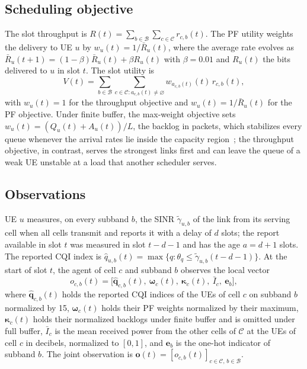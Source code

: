 \documentclass{ieeeaccess}
\begin{document}
\subsection{Scheduling objective}
The slot throughput is $R(t) = \sum_{b \in \mathcal{B}} \sum_{c \in \mathcal{C}} r_{c,b}(t)$. The PF utility weights the delivery to UE $u$ by $w_u(t) = 1/\bar{R}_u(t)$, where the average rate evolves as $\bar{R}_u(t+1) = (1 - \beta)\bar{R}_u(t) + \beta R_u(t)$ with $\beta = 0.01$ and $R_u(t)$ the bits delivered to $u$ in slot $t$. The slot utility is
\begin{equation}
V(t) = \sum_{b \in \mathcal{B}} \sum_{c \in \mathcal{C} : a_{c,b}(t) \ne \varnothing} w_{a_{c,b}(t)}(t)\, r_{c,b}(t),
\label{eq:utility}
\end{equation}
with $w_u(t) = 1$ for the throughput objective and $w_u(t) = 1/\bar{R}_u(t)$ for the PF objective. Under finite buffer, the max-weight objective sets $w_u(t) = (Q_u(t) + A_u(t))/L$, the backlog in packets, which stabilizes every queue whenever the arrival rates lie inside the capacity region~\cite{tassiulas1992stability}; the throughput objective, in contrast, serves the strongest links first and can leave the queue of a weak UE unstable at a load that another scheduler serves.

\subsection{Observations}
UE $u$ measures, on every subband $b$, the SINR $\tilde{\gamma}_{u,b}$ of the link from its serving cell when all cells transmit and reports it with a delay of $d$ slots; the report available in slot $t$ was measured in slot $t - d - 1$ and has the age $a = d + 1$ slots. The reported CQI index is $\hat{q}_{u,b}(t) = \max\{ q : \theta_q \le \tilde{\gamma}_{u,b}(t - d - 1) \}$. At the start of slot $t$, the agent of cell $c$ and subband $b$ observes the local vector
\begin{equation}
o_{c,b}(t) = \bigl[\hat{\mathbf{q}}_{c,b}(t),\ \boldsymbol{\omega}_{c}(t),\ \boldsymbol{\kappa}_{c}(t),\ \bar{I}_{c},\ \mathbf{e}_b\bigr],
\label{eq:obs}
\end{equation}
where $\hat{\mathbf{q}}_{c,b}(t)$ holds the reported CQI indices of the UEs of cell $c$ on subband $b$ normalized by 15, $\boldsymbol{\omega}_{c}(t)$ holds their PF weights normalized by their maximum, $\boldsymbol{\kappa}_{c}(t)$ holds their normalized backlogs under finite buffer and is omitted under full buffer, $\bar{I}_{c}$ is the mean received power from the other cells of $\mathcal{C}$ at the UEs of cell $c$ in decibels, normalized to $[0, 1]$, and $\mathbf{e}_b$ is the one-hot indicator of subband $b$. The joint observation is $\mathbf{o}(t) = [o_{c,b}(t)]_{c \in \mathcal{C},\, b \in \mathcal{B}}$.
\end{document}
